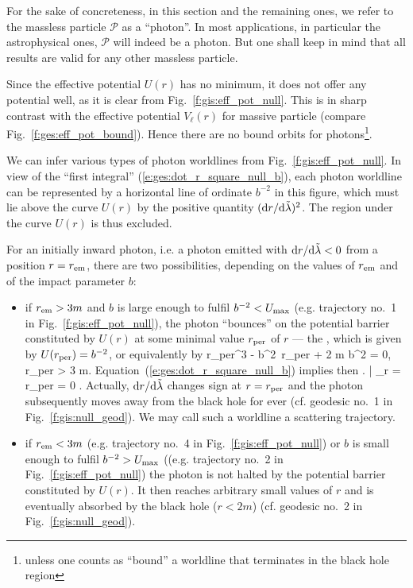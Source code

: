 For the sake of concreteness, in this section and the remaining ones, we
refer to the massless particle $\mathscr{P}$ as a ``photon''. In most applications, in
particular the astrophysical ones, $\mathscr{P}$ will indeed be a photon.
But one shall keep in mind that all results are valid for any other massless
particle.

Since the effective potential
$U(r)$ has no minimum, it does not offer any potential well,
as it is clear from Fig.~\ref{f:gis:eff_pot_null}. This is in sharp contrast
with the effective potential $V_\ell(r)$ for massive particle
(compare Fig.~\ref{f:ges:eff_pot_bound}). Hence there are no bound orbits
for photons\footnote{unless one counts as ``bound'' a worldline that terminates in the
black hole region}.

We can infer various types of photon worldlines from Fig.~\ref{f:gis:eff_pot_null}.
In view of the ``first integral'' (\ref{e:ges:dot_r_square_null_b}),
each photon worldline can be represented by a horizontal line of ordinate
$b^{-2}$ in this figure, which must lie above the curve $U(r)$
by the positive quantity $({\mathrm{d} r}/{\mathrm{d}\tilde{\lambda}})^2$. The region under the curve
$U(r)$ is thus excluded.

For an initially inward photon, i.e. a photon emitted with ${\mathrm{d} r}/{\mathrm{d}\tilde{\lambda}} < 0$
from a position $r=r_{\rm em}$, there are
two possibilities, depending on the values of $r_{\rm em}$ and
of the impact parameter $b$:
\begin{itemize}
\item if $r_{\rm em} > 3 m$ and $b$ is large enough to fulfil $b^{-2} < U_{\rm max}$
(e.g. trajectory no.~1 in Fig.~\ref{f:gis:eff_pot_null}), the photon
``bounces'' on the potential barrier constituted by $U(r)$
at some minimal value  $r_{\rm per}$ of $r$ --- the ,
which is given by  $U(r_{\rm per}) = b^{-2}$, or equivalently by
\be \label{e:ges:r_per_null}
  r_{\rm per}^3 - b^2\, r_{\rm per} + 2 m b^2 = 0, \quad r_{\rm per} > 3 m.
\ee
Equation~(\ref{e:ges:dot_r_square_null_b})
implies then
\be
    \left.  \right| _{r = r_{\rm per}} = 0 .
\ee
Actually, $\mathrm{d} r / \mathrm{d}\tilde{\lambda}$ changes sign at $r = r_{\rm per}$ and
the photon subsequently moves away from the black hole for ever (cf. geodesic
no.~1 in Fig.~\ref{f:gis:null_geod}). We may call
such a worldline a scattering trajectory.
\item if $r_{\rm em} < 3 m$ (e.g. trajectory
no.~4 in Fig.~\ref{f:gis:eff_pot_null}) or $b$ is small enough to fulfil $b^{-2} > U_{\rm max}$ ((e.g. trajectory
no.~2 in Fig.~\ref{f:gis:eff_pot_null}) the photon
is not halted by the potential barrier constituted by $U(r)$. It then reaches arbitrary
small values of $r$ and is eventually absorbed by the black hole ($r < 2m$)
(cf. geodesic no.~2 in Fig.~\ref{f:gis:null_geod}).
\end{itemize}

